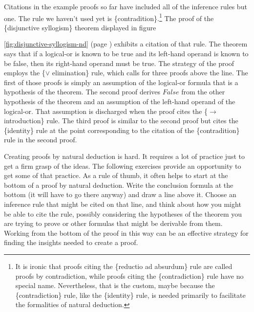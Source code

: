 {Citations in the example proofs so far have included all of the inference rules
but one. The rule we haven't used yet is \{contradition\}.\footnote{It
is ironic that proofs citing the \{reductio ad absurdum\} rule
are called proofs by contradiction, while proofs citing the
\{contradiction\} rule have no special name.
Nevertheless, that is the custom, maybe because
the \{contradiction\} rule, like the \{identity\} rule,
is needed primarily to facilitate the formalities of
natural deduction.}
The proof of the \{disjunctive syllogism\} theorem displayed in
figure~{\ref{fig:disjunctive-syllogism-nd} (page \pageref{fig:disjunctive-syllogism-nd})
exhibits a citation of that rule.
The theorem says that if a logical-or is known to be true
and its left-hand operand is known to be false,
then its right-hand operand must be true.
The strategy of the proof employs the \{$\vee$ elimination\} rule,
which calls for three proofs above the line.
The first of those proofs is simply an assumption of
the logical-or formula that is a hypothesis of the theorem.
The second proof derives $False$ from the other hypothesis
of the theorem and an assumption of the left-hand operand
of the logical-or. That assumption is discharged when
the proof cites the \{$\rightarrow$ introduction\} rule.
The third proof is similar to the second proof
but cites the \{identity\} rule at the point
corresponding to the citation of the \{contradition\} rule in the second proof.

Creating proofs by
natural deduction is hard.
It requires a lot of practice just to get
a firm grasp of the ideas.
The following exercises provide an opportunity
to get some of that practice. As a
rule of thumb,
it often helps to start at the bottom
of a proof by natural deduction. Write the conclusion formula
at the bottom (it will have to go there anyway)
and draw a line above it. Choose an inference rule that
might be cited on that line, and think about how you might
be able to cite the rule, possibly considering the hypotheses of
the theorem you are trying to prove or other formulas
that might be derivable from them. Working from the bottom
of the proof in this way can be an effective strategy for
finding the insights needed to create a proof.

}}
